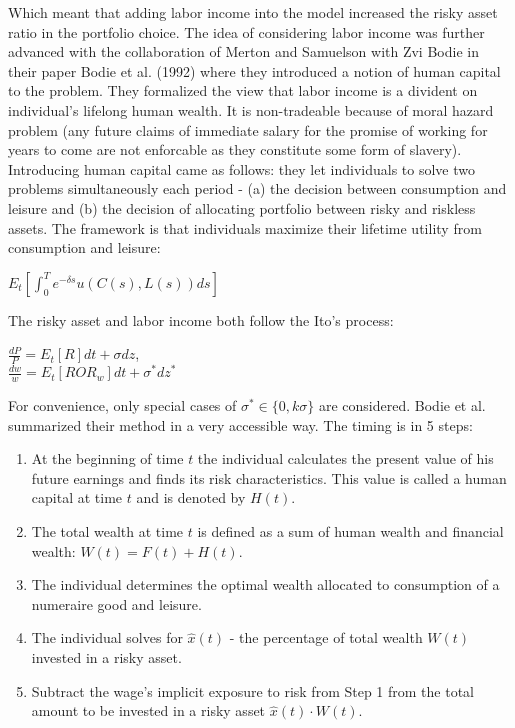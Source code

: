 Which meant that adding labor income into the model increased the risky asset ratio in the portfolio choice. The idea of considering labor income was further advanced with the collaboration of Merton and Samuelson with Zvi Bodie in their paper Bodie et al. (1992) where they introduced a notion of human capital to the problem. They formalized the view that labor income is a divident on individual's lifelong human wealth. It is non-tradeable because of moral hazard problem (any future claims of immediate salary for the promise of working for years to come are not enforcable as they constitute some form of slavery). Introducing human capital came as follows: they let individuals to solve two problems simultaneously each period - (a) the decision between consumption and leisure and (b) the decision of allocating portfolio between risky and riskless assets. The framework is that individuals maximize their lifetime utility from consumption and leisure:

\begin{center}
	$E_t[\int_0^T e^{-\delta s} u(C(s), L(s))ds]$
\end{center}

The risky asset and labor income both follow the Ito's process:

\begin{center}
	$\frac{dP}{P} = E_t[R]dt + \sigma dz$,\\
	$\frac{dw}{w} = E_t[ROR_w]dt + \sigma^* dz^*$
\end{center}

For convenience, only special cases of $\sigma^* \in \{0, k\sigma \}$ are considered. Bodie et al. summarized their method in a very accessible way. The timing is in 5 steps:

\begin{enumerate}
	\item At the beginning of time $t$ the individual calculates the present value of his future earnings and finds its risk characteristics. This value is called a human capital at time $t$ and is denoted by $H(t)$.
	\item The total wealth at time $t$ is defined as a sum of human wealth and financial wealth: $W(t) = F(t) + H(t)$.
	\item The individual determines the optimal wealth allocated to consumption of a numeraire good and leisure.
	\item The individual solves for $\hat{x}(t)$ - the percentage of total wealth $W(t)$ invested in a risky asset.
	\item Subtract the wage's implicit exposure to risk from Step 1 from the total amount to be invested in a risky asset $\hat{x}(t) \cdot W(t)$.
\end{enumerate}

